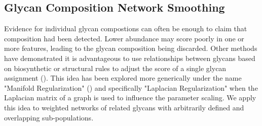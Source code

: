 \subsection{Glycan Composition Network Smoothing}
        Evidence for individual glycan compostions can often be enough to claim
    that composition had been detected. Lower abundance may score poorly in one
    or more features, leading to the glycan composition being discarded. Other
    methods have demonstrated it is advantageous to use relationships between
    glycans based on biosynthetic or structural rules to adjust the score of a
    single glycan assignment (\cite{Goldberg2009, Kronewitter2014}). This idea
    has been explored more generically under the name "Manifold Regularization"
    (\cite{Belkin2006}) and specifically "Laplacian Regularization" when the
    Laplacian matrix of a graph is used to influence the parameter scaling. We
    apply this idea to weighted networks of related glycans with arbitrarily
    defined and overlapping sub-populations.

    

    

    

    